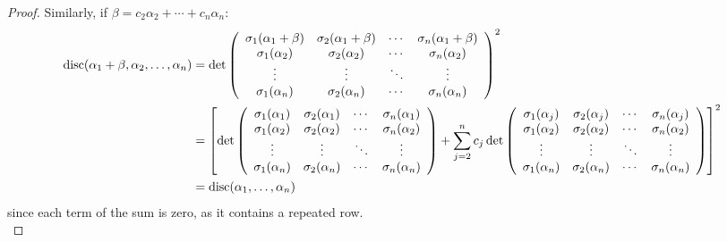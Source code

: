\begin{proof}
	Similarly, if $\beta = c_2\alpha_2+\cdots+c_n\alpha_n$:
	\begin{align*}
	\operatorname{disc}(\alpha_1+\beta,\alpha_2,\ldots,\alpha_n)
		&= \det\left(\begin{array}{cccc} \sigma_1(\alpha_1+\beta) & \sigma_2(\alpha_1+\beta) & \cdots & \sigma_n(\alpha_1+\beta) \\ \sigma_1(\alpha_2) & \sigma_2(\alpha_2) & \cdots & \sigma_n(\alpha_2) \\ \vdots & \vdots & \ddots & \vdots \\ \sigma_1(\alpha_n) & \sigma_2(\alpha_n) & \cdots & \sigma_n(\alpha_n) \\ \end{array}\right)^2 \\
		&= \left[\det\left(\begin{array}{cccc} \sigma_1(\alpha_1) & \sigma_2(\alpha_1) & \cdots & \sigma_n(\alpha_1) \\ \sigma_1(\alpha_2) & \sigma_2(\alpha_2) & \cdots & \sigma_n(\alpha_2) \\ \vdots & \vdots & \ddots & \vdots \\ \sigma_1(\alpha_n) & \sigma_2(\alpha_n) & \cdots & \sigma_n(\alpha_n) \\ \end{array}\right)+\sum_{j=2}^n c_j\det\left(\begin{array}{cccc} \sigma_1(\alpha_j) & \sigma_2(\alpha_j) & \cdots & \sigma_n(\alpha_j) \\ \sigma_1(\alpha_2) & \sigma_2(\alpha_2) & \cdots & \sigma_n(\alpha_2) \\ \vdots & \vdots & \ddots & \vdots \\ \sigma_1(\alpha_n) & \sigma_2(\alpha_n) & \cdots & \sigma_n(\alpha_n) \\ \end{array}\right)\right]^2 \\
		&= \operatorname{disc}(\alpha_1,\ldots,\alpha_n)
	\end{align*}
	since each term of the sum is zero, as it contains a repeated row. \\
\end{proof}
